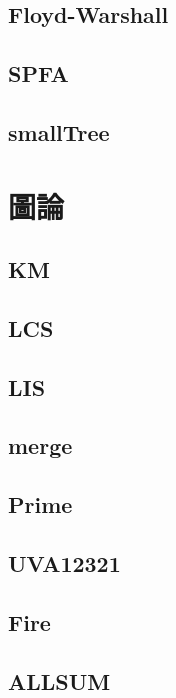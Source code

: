     \subsection{Floyd-Warshall}
        
    \subsection{SPFA}
        
    \subsection{smallTree}
        

\section{圖論}
    \subsection{KM}
        
    \subsection{LCS}
        
    \subsection{LIS}
        
    \subsection{merge}
          
    \subsection{Prime}
        
    \subsection{UVA12321}
        
    \subsection{Fire}
        
    \subsection{ALLSUM}
        

